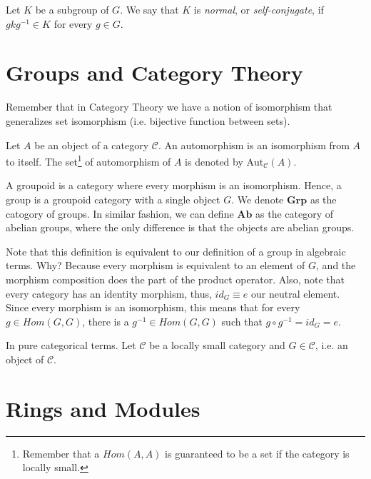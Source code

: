 \begin{definition}
	Let $K$ be a subgroup of $G$. We say that $K$ is \textit{normal},
	or \textit{self-conjugate}, if $g k g^{-1} \in K$ for every $g \in G$.
\end{definition}

\section{Groups and Category Theory}

Remember that in Category Theory we have a notion of isomorphism
that generalizes set isomorphism (i.e. bijective function between sets).

\begin{definition}[Automorphism]
	Let $A$ be an object of a category $\mathcal C$. An automorphism
	is an isomorphism from $A$ to itself. The set\footnote{Remember
		that a $Hom(A,A)$ is guaranteed to be a set if the category is locally small.}
	of automorphism of $A$ is denoted by $\text{Aut}_\mathcal C(A)$.
\end{definition}

\begin{definition}
	A groupoid is a category where every morphism is an isomorphism.
	Hence, a group is a groupoid category with a single object $G$.
	We denote $\textbf{Grp}$ as the catogory of groups. In similar
	fashion, we can define $\textbf{Ab}$ as the category of abelian
	groups, where the only difference is that the objects are abelian
	groups.
\end{definition}

Note that this definition is equivalent to our definition of
a group in algebraic terms. Why? Because every morphism
is equivalent to an element of $G$, and the morphism composition
does the part of the product operator. Also, note that
every category has an identity morphism, thus,
$id_G \equiv e$ our neutral element. Since every morphism
is an isomorphism, this means that for every $g \in Hom(G,G)$,
there is a $g^{-1} \in Hom(G,G)$ such that $g \circ g^{-1} = id_G = e$.

In pure categorical terms. Let $\mathcal C$ be a locally small category
and $G \in \mathcal C$, i.e. an object of $\mathcal C$.

\section{Rings and Modules}

